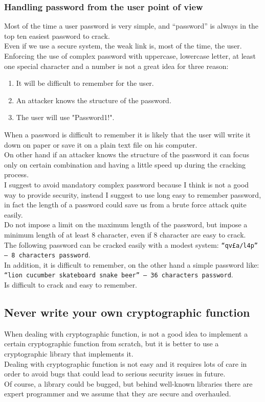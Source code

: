 \subsubsection{Handling password from the user point of view}
Most of the time a user password is very simple, and “password” is always in the top ten easiest password to crack.\\
Even if we use a secure system, the weak link is, most of the time, the user.\\
Enforcing the use of complex password with uppercase, lowercase letter, at least one special character and a number is not a great idea for three reason:
\begin{enumerate}
	\item It will be difficult to remember for the user.
	\item An attacker knows the structure of the password.
	\item The user will use "Password1!".
\end{enumerate}

When a password is difficult to remember it is likely that the user will write it down on paper or save it on a plain text file on his computer.\\
On other hand if an attacker knows the structure of the password it can focus only on certain combination and having a little speed up during the cracking process.\\

I suggest to avoid mandatory complex password because I think is not a good way to provide security, instead I suggest to use long easy to remember password, in fact the length of a password could save us from a brute force attack quite easily.\\
Do not impose a limit on the maximum length of the password, but impose a minimum length of at least 8 character, even if 8 character are easy to crack.\\
The following password can be cracked easily with a modest system:
\texttt{“qv£a/l4p” – 8 characters password}.\\
In addition, it is difficult to remember, on the other hand a simple password like:
\texttt{“lion cucumber skateboard snake beer” – 36 characters password}.\\
Is difficult to crack and easy to remember.

\subsection{Never write your own cryptographic function}
When dealing with cryptographic function, is not a good idea to implement a certain cryptographic function from scratch, but it is better to use a cryptographic library that implements it.\\
Dealing with cryptographic function is not easy and it requires lots of care in order to avoid bugs that could lead to serious security issues in future.\\
Of course, a library could be bugged, but behind well-known libraries there are expert programmer and we assume that they are secure and overhauled.\\

